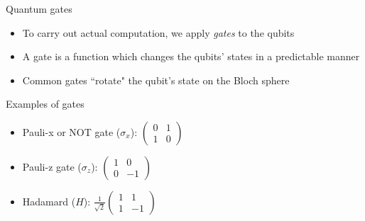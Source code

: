\documentclass[14pt]{beamer}
\let\olditem\item
\renewcommand{\item}{%
\olditem\vspace{10pt}}
\begin{document}
\begin{frame}{Quantum gates}
\begin{itemize}
	\item To carry out actual computation, we apply \textit{gates} to the qubits
  	\item A gate is a function which changes the qubits' states in a predictable manner
  	\item Common gates ``rotate" the qubit's state on the Bloch sphere
\end{itemize}
\end{frame}

\begin{frame}{Examples of gates}
\begin{itemize}
	\item Pauli-x or NOT gate ($\sigma_x$): $\begin{pmatrix} 0 & 1 \\ 1 & 0 \end{pmatrix}$
	\item Pauli-z gate ($\sigma_z$): $\begin{pmatrix} 1 & 0 \\ 0 & -1 \end{pmatrix}$
	\item Hadamard ($H$): $\frac{1}{\sqrt{2}}\begin{pmatrix} 1 & 1 \\ 1 & -1 \end{pmatrix}$
\end{itemize}
\end{frame}
\end{document}
